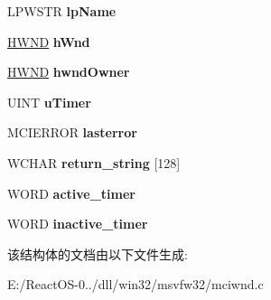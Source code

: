 \begin{DoxyCompactItemize}
\mbox{\label{struct_m_c_i_wnd_info_a1526a6b9f3ecfb630e3df7a0dd39c5d4}} 
L\+P\+W\+S\+TR {\bfseries lp\+Name}
\item 
\mbox{\label{struct_m_c_i_wnd_info_a63d51ebcd63370f842a0fc650eda4bff}} 
\hyperlink{interfacevoid}{H\+W\+ND} {\bfseries h\+Wnd}
\item 
\mbox{\label{struct_m_c_i_wnd_info_abaabe8bb83adfcf56cdeaedcb62df901}} 
\hyperlink{interfacevoid}{H\+W\+ND} {\bfseries hwnd\+Owner}
\item 
\mbox{\label{struct_m_c_i_wnd_info_abd5d9f0a2336075d6bb122604fc69edf}} 
U\+I\+NT {\bfseries u\+Timer}
\item 
\mbox{\label{struct_m_c_i_wnd_info_a95c164d737e67f73c549f67ba7552b12}} 
M\+C\+I\+E\+R\+R\+OR {\bfseries lasterror}
\item 
\mbox{\label{struct_m_c_i_wnd_info_a19b793aa8ff410a3a78113bba52ca2a1}} 
W\+C\+H\+AR {\bfseries return\+\_\+string} \mbox{[}128\mbox{]}
\item 
\mbox{\label{struct_m_c_i_wnd_info_a81d463d05b194a159f87ced7ba9eef43}} 
W\+O\+RD {\bfseries active\+\_\+timer}
\item 
\mbox{\label{struct_m_c_i_wnd_info_a5df05e2e478c6ce88b447b7b6820d4c8}} 
W\+O\+RD {\bfseries inactive\+\_\+timer}
\end{DoxyCompactItemize}


该结构体的文档由以下文件生成\+:\begin{DoxyCompactItemize}
\item 
E\+:/\+React\+O\+S-\/0../dll/win32/msvfw32/mciwnd.\+c\end{DoxyCompactItemize}
